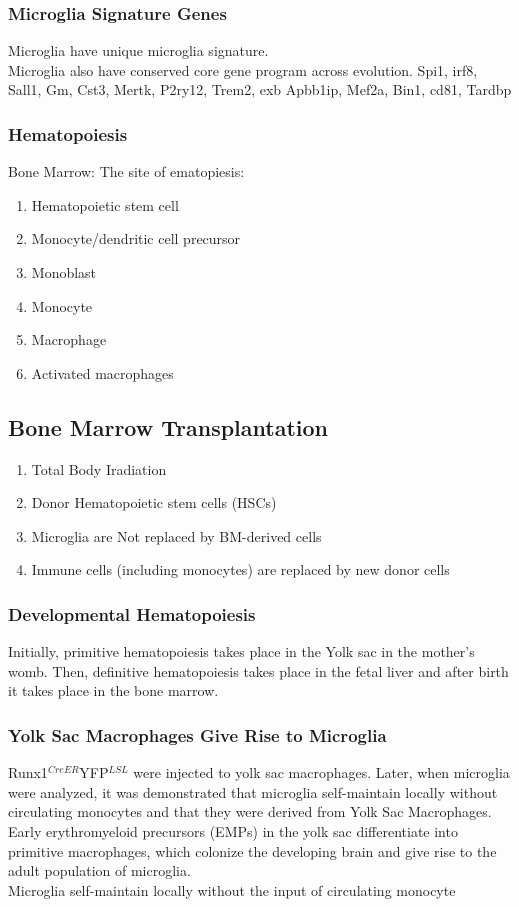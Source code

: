 \begin{itemize}
\begin{itemize}
\subsubsection{Microglia Signature Genes}
Microglia have unique microglia signature. 
\\Microglia also have conserved core gene program across evolution. Spi1, irf8, Sall1, Gm, Cst3, Mertk, P2ry12, Trem2, exb Apbb1ip, Mef2a, Bin1, cd81, Tardbp

\subsubsection{Hematopoiesis}
Bone Marrow: The site of ematopiesis: 
\begin{enumerate}
    \item Hematopoietic stem cell
    \item Monocyte/dendritic cell precursor
    \item Monoblast
    \item Monocyte
    \item Macrophage
    \item Activated macrophages
\end{enumerate}
\subsection{Bone Marrow Transplantation}
\begin{enumerate}
    \item Total Body Iradiation
    \item Donor Hematopoietic stem cells (HSCs)
    \item Microglia are Not replaced by BM-derived cells
    \item Immune cells (including monocytes) are replaced by new donor cells
\end{enumerate}
\subsubsection{Developmental Hematopoiesis}
Initially, primitive hematopoiesis takes place in the Yolk sac in the mother's womb. Then, definitive hematopoiesis takes place in the fetal liver and after birth it takes place in the bone marrow.

\subsubsection{Yolk Sac Macrophages Give Rise to Microglia}
Runx1$^{CreER}$YFP$^{LSL}$ were injected to yolk sac macrophages. Later, when microglia were analyzed, it was demonstrated that microglia self-maintain locally without circulating monocytes and that they were derived from Yolk Sac Macrophages.
\\Early erythromyeloid precursors (EMPs) in the
yolk sac differentiate into primitive
macrophages, which colonize the developing
brain and give rise to the adult population of
microglia.
\\Microglia self-maintain locally without the input
of circulating monocyte


\end{itemize}
\end{itemize}
